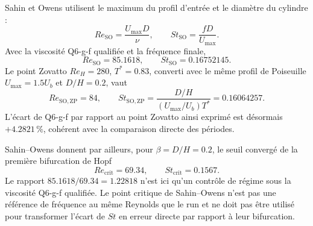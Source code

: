 \documentclass[11pt,a4paper]{article}
\begin{document}
Sahin et Owens utilisent le maximum du profil d'entrée et le diamètre du cylindre \cite{SahinOwens2004} :
\begin{equation}
 Re_{\mathrm{SO}}=\frac{U_{\max}D}{\nu},
 \qquad
 St_{\mathrm{SO}}=\frac{fD}{U_{\max}}.
 \label{eq:x8-so-def}
\end{equation}
Avec la viscosité Q6-g-f qualifiée et la fréquence finale,
\begin{equation}
 Re_{\mathrm{SO}}=85.1618,\qquad
 St_{\mathrm{SO}}=0.16752145.
\end{equation}
Le point Zovatto $Re_H=280$, $T^*=0.83$, converti avec le même profil de Poiseuille $U_{\max}=1.5U_b$ et $D/H=0.2$, vaut
\begin{equation}
 Re_{\mathrm{SO,ZP}}=84,\qquad
 St_{\mathrm{SO,ZP}}=
 \frac{D/H}{(U_{\max}/U_b)T^*}
 =0.16064257.
\end{equation}
L'écart de Q6-g-f par rapport au point Zovatto ainsi exprimé est désormais $+4.2821\,\%$, cohérent avec la comparaison directe des périodes.

Sahin--Owens donnent par ailleurs, pour $\beta=D/H=0.2$, le seuil convergé de la première bifurcation de Hopf
\begin{equation}
 Re_{\mathrm{crit}}=69.34,\qquad St_{\mathrm{crit}}=0.1567.
\end{equation}
Le rapport $85.1618/69.34=1.22818$ n'est ici qu'un contrôle de régime sous la viscosité Q6-g-f qualifiée. Le point critique de Sahin--Owens n'est pas une référence de fréquence au même Reynolds que le run et ne doit pas être utilisé pour transformer l'écart de $St$ en erreur directe par rapport à leur bifurcation.
\end{document}
